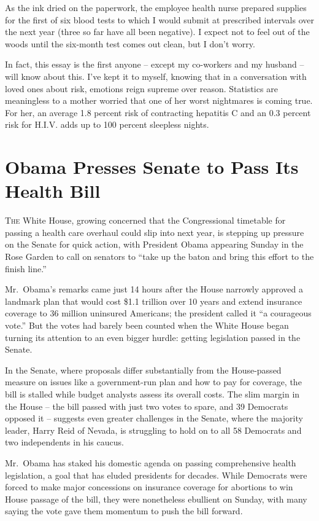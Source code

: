 ﻿\documentclass[12pt]{article}
\begin{document}
As the ink dried on the paperwork, the employee health nurse prepared supplies for the first of six
blood tests to which I would submit at prescribed intervals over the next year (three so far have
all been negative). I expect not to feel out of the woods until the six-month test comes out clean,
but I don't worry.

In fact, this essay is the first anyone -- except my co-workers and my husband -- will know about
this. I've kept it to myself, knowing that in a conversation with loved ones about risk, emotions
reign supreme over reason. Statistics are meaningless to a mother worried that one of her worst
nightmares is coming true. For her, an average 1.8 percent risk of contracting hepatitis C and an
0.3 percent risk for H.I.V. adds up to 100 percent sleepless nights.

\section{Obama Presses Senate to Pass Its Health Bill}

\lettrine{T}{he} White House, growing concerned that the Congressional
timetable for passing a health care overhaul could slip into next year, is stepping up pressure on
the Senate for quick action, with President Obama appearing Sunday in the Rose Garden to call on
senators to ``take up the baton and bring this effort to the finish line.''

Mr.~Obama's remarks came just 14 hours after the House narrowly approved a landmark plan that would
cost \$1.1 trillion over 10 years and extend insurance coverage to 36 million uninsured Americans;
the president called it ``a courageous vote.'' But the votes had barely been counted when the White
House began turning its attention to an even bigger hurdle: getting legislation passed in the
Senate.

In the Senate, where proposals differ substantially from the House-passed measure on issues like a
government-run plan and how to pay for coverage, the bill is stalled while budget analysts assess
its overall costs. The slim margin in the House -- the bill passed with just two votes to spare, and
39 Democrats opposed it -- suggests even greater challenges in the Senate, where the majority
leader, Harry Reid of Nevada, is struggling to hold on to all 58 Democrats and two independents in
his caucus.

Mr.~Obama has staked his domestic agenda on passing comprehensive health legislation, a goal that
has eluded\cite{elude} presidents for decades. While Democrats were forced to make major concessions
on insurance coverage for abortions to win House passage of the bill, they were nonetheless
ebullient on Sunday, with many saying the vote gave them momentum to push the bill forward.
\end{document}
